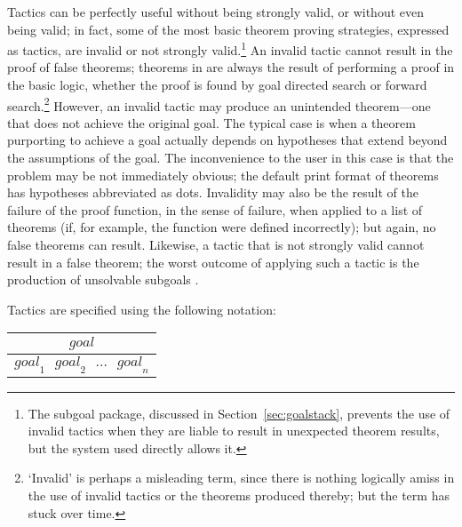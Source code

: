 Tactics can be perfectly useful without being
strongly valid, or without
even being valid;
in fact, some of the most basic theorem proving strategies, expressed
as tactics, are invalid or not strongly valid.\footnote{The subgoal
  package, discussed in Section~\ref{sec:goalstack}, prevents the use of
  invalid tactics when they are liable to result in unexpected
  theorem results, but the \HOL{} system used directly allows
  it.}
An invalid tactic cannot result in the proof of false theorems;
theorems in \HOL{} are always the result of performing a proof in the
basic logic, whether the proof is found by goal directed search
or forward search.\footnote{`Invalid' is perhaps a misleading term, since
  there is nothing logically amiss in the use of invalid tactics
  or the theorems produced thereby; but the term has stuck over time.}
However, an invalid tactic may produce an unintended theorem---one
that does not achieve the original goal. The typical case is when a
theorem purporting to achieve a goal actually depends on hypotheses
that extend beyond the assumptions of the goal.  The inconvenience to
the \HOL{} user in this case is that the problem may be not
immediately obvious; the default print format of theorems has
hypotheses abbreviated as dots. Invalidity may also be the result of
the failure
of the proof function, in the \ML{} sense of failure, when
applied to a list of theorems (if, for example, the function were
defined incorrectly); but again, no false theorems can result.
Likewise, a tactic that is not strongly valid cannot result in a false
theorem; the worst outcome of applying such a tactic is the production
of unsolvable subgoals%
%
.

Tactics are specified using the following notation:

\begin{center}
\begin{tabular}{c} \\
$\mathit{goal}$ \\ \hline \hline
$\mathit{goal}_1\ \ \ \mathit{goal}_2 \ \ \ \ldots\ \ \ \mathit{goal}_n$ \\
\end{tabular}
\end{center}

